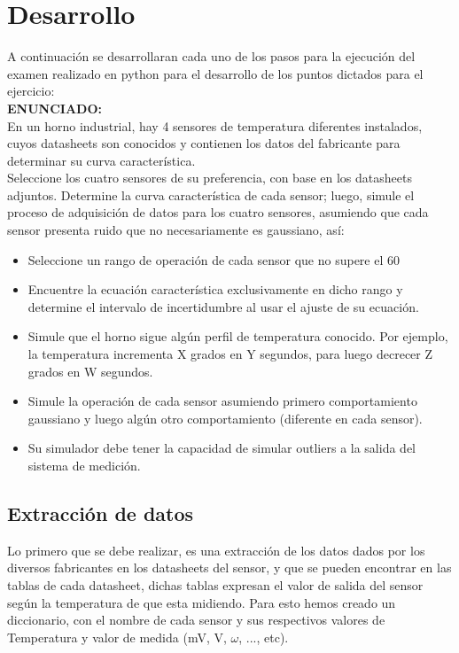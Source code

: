 \documentclass[conference]{IEEEtran}
\begin{document}
\section{Desarrollo}

A continuación se desarrollaran cada uno de los pasos para la ejecución del examen realizado en python para el desarrollo de los puntos dictados para el ejercicio:\\

\textbf{ENUNCIADO:}\\

En un horno industrial, hay 4 sensores de temperatura diferentes instalados, cuyos datasheets son conocidos y contienen los datos del fabricante para determinar su curva característica. \\

Seleccione los cuatro sensores de su preferencia, con base en los datasheets adjuntos. Determine la curva característica de cada sensor; luego, simule el proceso de adquisición de datos para los cuatro sensores, asumiendo que cada sensor presenta ruido que no necesariamente es gaussiano, así:\\

\begin{itemize}
	\item Seleccione un rango de operación de cada sensor que no supere el 60%
	\item Encuentre la ecuación característica exclusivamente en dicho rango y determine el intervalo de incertidumbre al usar el ajuste de su ecuación.
	\item Simule que el horno sigue algún perfil de temperatura conocido. Por ejemplo, la temperatura incrementa X grados en Y segundos, para luego decrecer Z grados en W segundos. 
	\item Simule la operación de cada sensor asumiendo primero comportamiento gaussiano y luego algún otro comportamiento (diferente en cada sensor).
	\item Su simulador debe tener la capacidad de simular outliers a la salida del sistema de medición. 
\end{itemize}




\subsection{Extracci\'on de datos}

Lo primero que se debe realizar, es una extracción de los datos dados por los diversos fabricantes en los datasheets del sensor, y que se pueden encontrar en las tablas de cada datasheet, dichas tablas expresan el valor de salida del sensor según la temperatura de que esta midiendo. Para esto hemos creado un diccionario, con el nombre de cada sensor y sus respectivos valores de Temperatura y valor de medida (mV, V, $\omega$, ..., etc).\\
\end{document}
